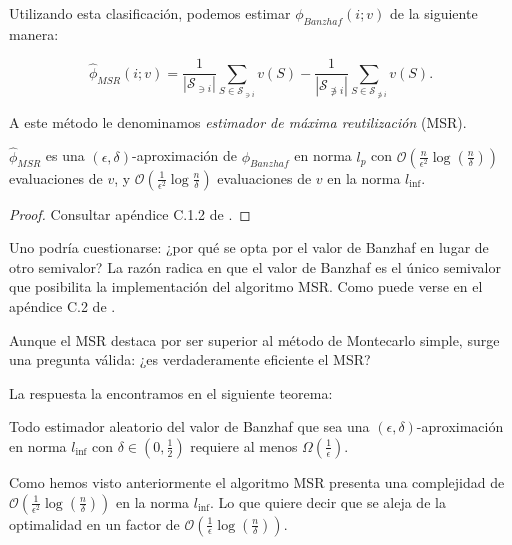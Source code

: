 Utilizando esta clasificación, podemos estimar
$\phi_{Banzhaf}(i;v)$ de la siguiente manera:

\begin{equation}
  \hat{\phi}_{MSR}(i;v) = \frac{1}{|\mathcal{S}_{\ni i}|}
  \sum_{S \in \mathcal{S}_{\ni i}} v(S) -
  \frac{1}{|\mathcal{S}_{\not \ni i}|}
  \sum_{S \in \mathcal{S}_{\not \ni i}} v(S).
\end{equation}

A este método le denominamos \textit{estimador de máxima
reutilización} (MSR).
\begin{theorem}
  $\hat{\phi}_{MSR}$ es una $(\epsilon,\delta)$-aproximación
  de $\phi_{Banzhaf}$ en norma $l_p$ con $\mathcal{O}
  (\frac{n}{\epsilon^2} \log(\frac{n}{\delta}))$ evaluaciones
  de $v$, y $\mathcal{O}(\frac{1}{\epsilon^2}
  \log{\frac{n}{\delta}})$ evaluaciones de $v$ en la norma
  $l_{\inf}$.
\end{theorem}

\begin{proof}
  Consultar apéndice C.1.2 de \cite{dataBanzhaf}.
\end{proof}

Uno podría cuestionarse: ¿por qué se opta por el valor
de Banzhaf en lugar de otro semivalor? La razón radica
en que el valor de Banzhaf es el único semivalor
que posibilita la implementación del algoritmo MSR.
Como puede verse en el apéndice C.2 de \cite{dataBanzhaf}.

Aunque el MSR destaca por ser superior al método de
Montecarlo simple, surge una pregunta válida:
¿es verdaderamente eficiente el MSR?

La respuesta la encontramos en el siguiente teorema:
\begin{theorem}
  Todo estimador aleatorio del valor de Banzhaf
  que sea una $(\epsilon,\delta)$-aproximación en norma
  $l_{\inf}$ con $\delta \in (0,\frac{1}{2})$ requiere
  al menos $\Omega(\frac{1}{\epsilon})$.
\end{theorem}

Como hemos visto anteriormente el algoritmo MSR presenta
una complejidad de $\mathcal{O}(\frac{1}{\epsilon^2}
\log(\frac{n}{\delta}))$ en la norma $l_{\inf}$.
Lo que quiere decir que se aleja de la optimalidad
en un factor de $\mathcal{O}(\frac{1}{\epsilon}
\log(\frac{n}{\delta}))$.